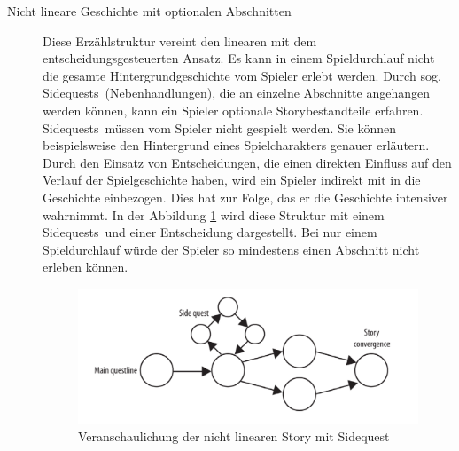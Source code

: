 \begin{description}
\item[Nicht lineare Geschichte mit optionalen Abschnitten]
Diese Erzählstruktur vereint den linearen mit dem entscheidungsgesteuerten Ansatz. Es kann in einem Spieldurchlauf nicht die gesamte Hintergrundgeschichte vom Spieler erlebt werden. Durch sog. \glqq Sidequests\grqq\ (Nebenhandlungen), die an einzelne Abschnitte angehangen werden können, kann ein Spieler optionale Storybestandteile erfahren. \glqq Sidequests\grqq\ müssen vom Spieler nicht gespielt werden. Sie können beispielsweise den Hintergrund eines Spielcharakters genauer erläutern. Durch den Einsatz von Entscheidungen, die einen direkten Einfluss auf den Verlauf der Spielgeschichte haben, wird ein Spieler indirekt mit in die Geschichte einbezogen. Dies hat zur Folge, das er die Geschichte intensiver wahrnimmt. In der Abbildung \ref{pic:storySQ}
wird diese Struktur mit einem \glqq Sidequests\grqq\ und einer Entscheidung dargestellt. Bei nur einem Spieldurchlauf würde der Spieler so mindestens einen Abschnitt nicht erleben können. \cite[S. 100]{Adams:1515529}
\begin{figure}[H]
    \centering
    \includegraphics[width=.8\textwidth]{files/story/storySidequest}
    \caption{Veranschaulichung der nicht linearen Story mit Sidequest}
    \label{pic:storySQ}
\end{figure} 

%
%
%



\end{description}
